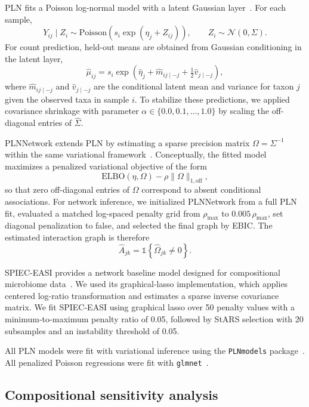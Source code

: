 \documentclass[USenglish]{article}
\theoremstyle{dgthm}
\begin{document}
PLN fits a Poisson log-normal model with a latent Gaussian layer~\citep{aitchison1989multivariate,Chiquet2021}.
For each sample,
\[
Y_{ij} \mid Z_i \sim \mathrm{Poisson}\!\left(s_i \exp(\eta_j + Z_{ij})\right),
\qquad
Z_i \sim \mathcal{N}(0, \Sigma).
\]
For count prediction, held-out means are obtained from Gaussian conditioning in the latent layer,
\[
\hat{\mu}_{ij}
=
s_i \exp\!\left(\hat{\eta}_j + \hat{m}_{ij \mid -j} + \tfrac{1}{2}\hat{v}_{j \mid -j}\right),
\]
where $\hat{m}_{ij \mid -j}$ and $\hat{v}_{j \mid -j}$ are the conditional latent mean and variance for taxon $j$ given the observed taxa in sample $i$.
To stabilize these predictions, we applied covariance shrinkage with parameter $\alpha \in \{0.0, 0.1, \ldots, 1.0\}$ by scaling the off-diagonal entries of $\hat{\Sigma}$.

PLNNetwork extends PLN by estimating a sparse precision matrix $\Omega = \Sigma^{-1}$ within the same variational framework~\citep{chiquet2019variational,Chiquet2021}.
Conceptually, the fitted model maximizes a penalized variational objective of the form
\[
\mathrm{ELBO}(\eta, \Omega) - \rho \lVert \Omega \rVert_{1,\mathrm{off}},
\]
so that zero off-diagonal entries of $\Omega$ correspond to absent conditional associations.
For network inference, we initialized PLNNetwork from a full PLN fit, evaluated a matched log-spaced penalty grid from $\rho_{\max}$ to $0.005\,\rho_{\max}$, set diagonal penalization to false, and selected the final graph by EBIC.
The estimated interaction graph is therefore
\[
\hat{A}_{jk} = \mathbb{1}\!\left\{\hat{\Omega}_{jk} \neq 0\right\}.
\]

SPIEC-EASI provides a network baseline model designed for compositional microbiome data~\citep{Kurtz2015SPIECEASI}.
We used its graphical-lasso implementation, which applies centered log-ratio transformation and estimates a sparse inverse covariance matrix.
We fit SPIEC-EASI using graphical lasso over 50 penalty values with a minimum-to-maximum penalty ratio of 0.05, followed by StARS selection with 20 subsamples and an instability threshold of 0.05.

All PLN models were fit with variational inference using the \texttt{PLNmodels} package~\citep{Chiquet2021}.
All penalized Poisson regressions were fit with \texttt{glmnet}~\citep{Friedman2010}.

\subsection{Compositional sensitivity analysis}
\label{subsec:clr-sensitivity-methods}
\end{document}
